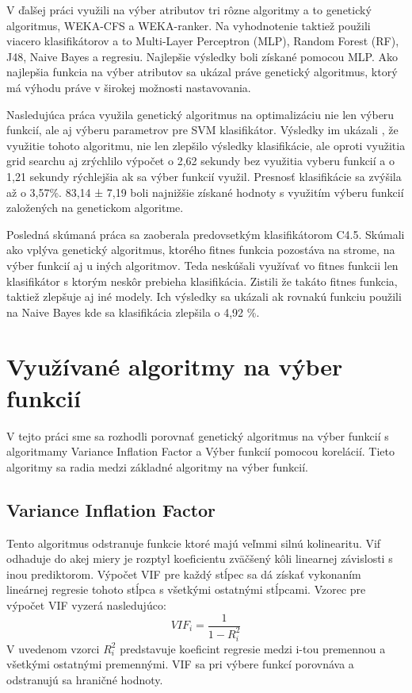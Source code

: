 \documentclass[runningheads]{llncs}
\begin{document}
V ďalšej práci\cite{ref_babatunde} využili na výber atributov tri rôzne algoritmy a to 
genetický algoritmus, WEKA-CFS a WEKA-ranker. Na vyhodnotenie taktiež použili viacero klasifikátorov
a to Multi-Layer Perceptron (MLP), Random Forest (RF), J48, Naive Bayes a regresiu. Najlepšie výsledky 
boli získané pomocou MLP. Ako najlepšia funkcia na výber atributov sa ukázal práve genetický algoritmus,
ktorý má výhodu práve v širokej možnosti nastavovania.

Nasledujúca práca\cite{ref_zhao} využila genetický algoritmus na optimalizáciu nie 
len výberu funkcií, ale aj výberu parametrov pre SVM klasifikátor. Výsledky im ukázali
, že využitie tohoto algoritmu, nie len zlepšilo výsledky klasifikácie, 
ale oproti využitia grid searchu aj zrýchlilo výpočet o 2,62 sekundy bez využitia
vyberu funkcií a o 1,21 sekundy rýchlejšia ak sa výber funkcií využil.
Presnosť klasifikácie sa zvýšila až o 3,57\%. 83,14 ± 7,19 boli najnižšie 
získané hodnoty s využitím výberu funkcií založených na genetickom algoritme.

Posledná skúmaná práca \cite{ref_smith} sa zaoberala predovsetkým klasifikátorom C4.5.
Skúmali ako vplýva genetický algoritmus, ktorého fitnes funkcia pozostáva na strome, 
na výber funkcií aj u iných algoritmov. Teda neskúšali využívať vo fitnes funkcii len
klasifikátor s ktorým neskôr prebieha klasifikácia. Zistili že takáto fitnes funkcia,
taktiež zlepšuje aj iné modely. Ich výsledky sa ukázali ak rovnakú funkciu použili na 
Naive Bayes kde sa klasifikácia zlepšila o 4,92 \%.


\section{Využívané algoritmy na výber funkcií}
V tejto práci sme sa rozhodli porovnať genetický algoritmus na výber funkcií s
algoritmamy Variance Inflation Factor a Výber funkcií pomocou korelácií. Tieto 
algoritmy sa radia medzi základné algoritmy na výber funkcií. \cite{ref_xu}
\subsection{Variance Inflation Factor}
Tento algoritmus odstranuje funkcie ktoré majú veľmmi silnú kolinearitu.
Vif odhaduje do akej miery je rozptyl koeficientu zväčšený kôli linearnej závislosti
s inou prediktorom. Výpočet VIF pre každý stĺpec sa dá získať vykonaním lineárnej 
regresie tohoto stĺpca s všetkými ostatnými stĺpcami.\cite{ref_xu}
Vzorec pre výpočet VIF vyzerá nasledujúco:
\begin{equation}
VIF_{i}=\frac{1}{1-R_{i}^{2}}
\end{equation}    
V uvedenom vzorci \begin{math}R_i^2\end{math} predstavuje koeficint regresie medzi i-tou premennou a 
všetkými ostatnými premennými. VIF sa pri výbere funkcí porovnáva a odstranujú sa hraničné hodnoty.\cite{ref_xu}
\end{document}
